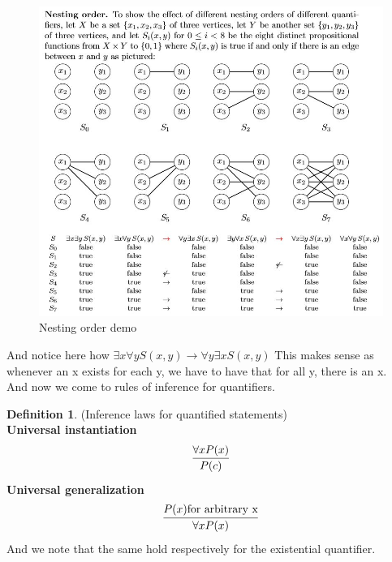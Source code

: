 \documentclass{article}
\theoremstyle{definition}
\newtheorem{definition}{Definition}
\numberwithin{equation}{subsection}
\numberwithin{remark}{subsection}
\begin{document}
\begin{figure}[H]
    \centering
    \includegraphics[scale = 0.8]{epflSemesterOne/advancedComputation/figures/nesting.JPG}
    \caption{Nesting order demo}
    \label{fig:my_label}
\end{figure}

And notice here how $\exists x \forall y S(x,y) \rightarrow \forall y \exists x S(x,y)$ This makes sense as whenever an x exists for each y, we have to have that for all y, there is an x. 
\\
\clearpage
And now we come to rules of inference for quantifiers. 

\begin{definition}(Inference laws for quantified statements)
\\
\textbf{Universal instantiation} 
\begin{equation*}
    \infer{P(c)}{\forall x P(x)}
\end{equation*}
\textbf{Universal generalization}
\begin{equation*}
        \infer{\forall x P(x)}{P(x) \text{for arbitrary x}}
\end{equation*}
And we note that the same hold respectively for the existential quantifier. 
\end{definition}
\end{document}
